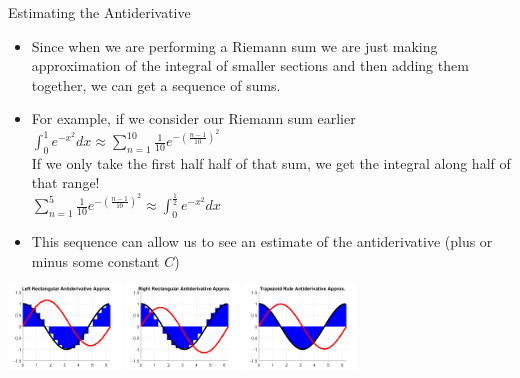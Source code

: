 {}\documentclass[letterpaper,
compress,
xcolor=x11names,
]{beamer}
\begin{document}
\begin{frame}{Estimating the Antiderivative}
	\footnotesize
	\begin{itemize}
		\item Since when we are performing a Riemann sum we are just making approximation of the integral of smaller sections and then adding them together, we can get a sequence of sums.
		\item For example, if we consider our Riemann sum earlier $\int_{0}^{1}e^{-x^2}dx \approx \sum_{n=1}^{10}\frac{1}{10}e^{-(\frac{n-1}{10})^2}$ \\
		If we only take the first half half of that sum, we get the integral along half of that range! \\
		$ \sum_{n=1}^{5}\frac{1}{10}e^{-(\frac{n-1}{10})^2} \approx \int_{0}^{\frac{1}{2}}e^{-x^2}dx$
		\item This sequence can allow us to see an estimate of the antiderivative (plus or minus some constant $C$)
	\end{itemize}
	\begin{center}
		\includegraphics[height = 2.25cm]{left_antideriv_approx.png} \hspace{0.5cm}
		\includegraphics[height = 2.25cm]{right_antideriv_approx.png} \hspace{0.5cm}
		\includegraphics[height = 2.25cm]{trapz_antideriv_approx.png}
	\end{center}
\end{frame}

\end{document}
